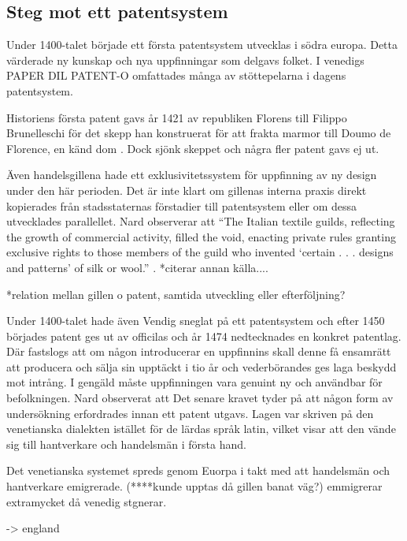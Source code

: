 \subsection{Steg mot ett patentsystem} %
\label{sub:steg_mot_ett_patent_system}
Under 1400-talet började ett första patentsystem utvecklas i södra europa. 
Detta värderade ny kunskap och nya uppfinningar som delgavs folket. 
I venedigs PAPER DIL PATENT-O omfattades många av stöttepelarna i dagens patentsystem. 


Historiens första patent gavs år 1421 av republiken Florens till Filippo Brunelleschi för det skepp han konstruerat för att frakta marmor till Doumo de Florence, en känd dom \cite{frumkin}. 
Dock sjönk skeppet och några fler patent gavs ej ut. 

Även handelsgillena hade ett exklusivitetssystem för uppfinning av ny design under den här perioden. Det är inte klart om gillenas interna praxis direkt kopierades från stadsstaternas förstadier till patentsystem eller om dessa utvecklades parallellet. Nard observerar att ``The Italian textile guilds, reflecting the growth of commercial activity, filled the void, enacting private rules granting exclusive rights to those members of the guild who invented ‘certain . . . designs and patterns' of silk or wool.'' \cite{nard}. *citerar annan källa....

*relation mellan gillen o patent, samtida utveckling eller efterföljning?

Under 1400-talet hade även Vendig sneglat på ett patentsystem och efter 1450 börjades patent ges ut av officilas och år 1474 nedtecknades en konkret patentlag\cite{frumkin}. 
Där fastslogs att om någon introducerar en uppfinnins skall denne få ensamrätt att producera och sälja sin upptäckt i tio år och vederbörandes ges laga beskydd mot intrång. 
I gengäld måste uppfinningen vara genuint ny och användbar för befolkningen. 
Nard observerat att Det senare kravet tyder på att någon form av undersökning erfordrades innan ett patent utgavs\cite{nard}. 
Lagen var skriven på den venetianska dialekten istället för de lärdas språk latin, vilket visar att den vände sig till hantverkare och handelsmän i första hand.

Det venetianska systemet spreds genom Euorpa i takt med att handelsmän och hantverkare emigrerade. 
(****kunde upptas då gillen banat väg?) emmigrerar extramycket då venedig stgnerar\cite{nard}.

-> england




